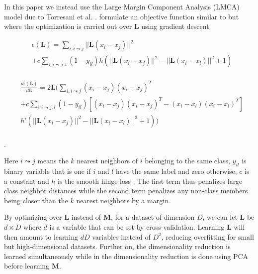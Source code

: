 In this paper we instead use the Large Margin Component Analysis (LMCA)
model due to Torresani et al. \cite{Torresani:2006wb}.
\cite{Torresani:2006wb} formulate an objective function similar to
\cite{Weinberger:2009to} but where the optimization is carried out over
\(\mathbf{L}\) using gradient descent.

\small 

\begin{equation}
\label{lossfun}
\begin{aligned}
& \epsilon(\mathbf{L}) = \sum\limits_{i,i \leadsto j} ||\mathbf{L} (x_i-x_j)||^{2}  \\
&  + c \sum\limits_{i,i \leadsto j,l}(1-y_{il})h(||\mathbf{L} (x_i-x_j)||^{2} - || \mathbf{L} (x_i-x_l)||^{2} +1 )  \\
\end{aligned}
\end{equation}

\begin{equation}
\label{lossfunderivative}
\begin{aligned}
& \frac{d\epsilon(\mathbf{L})}{d\mathbf{L}} = 2 \mathbf{L} ( \sum\limits_{i,i \leadsto j} (x_i-x_j)(x_i-x_j)^{T}  \\
&  + c \sum\limits_{i,i \leadsto j,l}(1-y_{il}) [(x_i-x_j)(x_i-x_j)^{T} - (x_i-x_l)(x_i-x_l)^{T} ]  \\
& h'(||\mathbf{L} (x_i-x_j)||^{2} - || \mathbf{L} (x_i-x_l)||^{2} +1 ) ) \\
\end{aligned}
\end{equation}

. \normalsize

Here \(i \leadsto j\) means the \(k\) nearest neighbors of \(i\)
belonging to the same class, \(y_{il}\) is binary variable that is one
if \(i\) and \(l\) have the same label and zero otherwise, \(c\) is a
constant and \(h\) is the smooth hinge loss \cite{Rennie:2005ds}. The
first term thus penalizes large class neighbor distances while the
second term penalizes any non-class members being closer than the \(k\)
nearest neighbors by a margin.

By optimizing over \(\mathbf{L}\) instead of \(\mathbf{M}\), for a
dataset of dimension \(D\), we can let \(\mathbf{L}\) be \(d \times D\)
where \(d\) is a variable that can be set by cross-validation. Learning
\(\mathbf{L}\) will then amount to learning \(dD\) variables instead of
\(D^2\), reducing overfitting for small but high-dimensional datasets.
Further on, the dimensionality reduction is learned simultaneously while
in \cite{Weinberger:2009to} the dimensionality reduction is done using
PCA before learning \(\mathbf{M}\).

